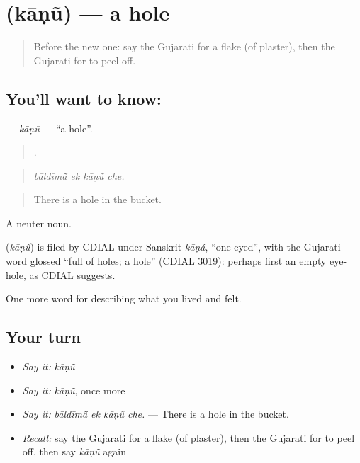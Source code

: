 \section[\texorpdfstring{\gu{કાણું} (kāṇũ)}{કાણું (kāṇũ)}]{ (kāṇũ) — a hole}

\label{lesson:GU-C515-kanu}



\begin{quote}
Before the new one: say the Gujarati for a flake (of plaster), then the Gujarati for to peel off.
\end{quote}

\subsection*{You'll want to know: }
\textbf{} — \emph{kāṇũ} — \textquotedblleft{}a hole\textquotedblright{}.

\begin{quote}
   .
\end{quote}

\begin{quote}
\emph{bāldīmā̃ ek kāṇũ che.}
\end{quote}

\begin{quote}
There is a hole in the bucket.
\end{quote}

A neuter noun.

\begin{cousinweb}
\textbf{} (\emph{kāṇũ}) is filed by CDIAL under Sanskrit \emph{kāṇá}, \textquotedblleft{}one-eyed\textquotedblright{}, with the Gujarati word glossed \textquotedblleft{}full of holes; a hole\textquotedblright{} (CDIAL 3019): perhaps first an empty eye-hole, as CDIAL suggests.
\end{cousinweb}

\begin{grammarlens}[title={What you've built}]
One more word for describing what you lived and felt.
\end{grammarlens}

\subsection*{Your turn}
\begin{itemize}
\raggedright
  \item \emph{Say it:} \emph{kāṇũ}
  \item \emph{Say it:} \emph{kāṇũ}, once more
  \item \emph{Say it:} \emph{bāldīmā̃ ek kāṇũ che.} — There is a hole in the bucket.
  \item \emph{Recall:} say the Gujarati for a flake (of plaster), then the Gujarati for to peel off, then say \emph{kāṇũ} again
\end{itemize}

